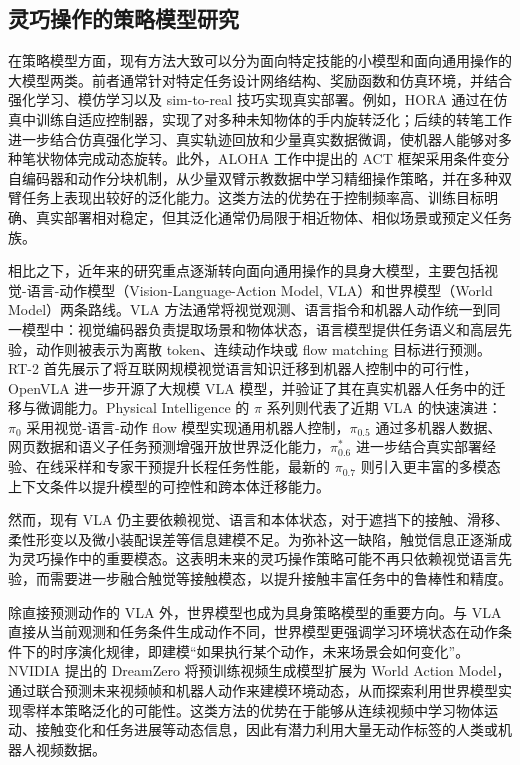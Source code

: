 \subsection{灵巧操作的策略模型研究}
在策略模型方面，现有方法大致可以分为面向特定技能的小模型和面向通用操作的大模型两类。前者通常针对特定任务设计网络结构、奖励函数和仿真环境，并结合强化学习、模仿学习以及 sim-to-real 技巧实现真实部署。例如，HORA 通过在仿真中训练自适应控制器，实现了对多种未知物体的手内旋转泛化\citep{qi2022hora}；后续的转笔工作进一步结合仿真强化学习、真实轨迹回放和少量真实数据微调，使机器人能够对多种笔状物体完成动态旋转\citep{wang2025penspin}。此外，ALOHA 工作中提出的 ACT 框架采用条件变分自编码器和动作分块机制，从少量双臂示教数据中学习精细操作策略，并在多种双臂任务上表现出较好的泛化能力\citep{Zhao-RSS-23}。这类方法的优势在于控制频率高、训练目标明确、真实部署相对稳定，但其泛化通常仍局限于相近物体、相似场景或预定义任务族。

相比之下，近年来的研究重点逐渐转向面向通用操作的具身大模型，主要包括视觉-语言-动作模型（Vision-Language-Action Model, VLA）和世界模型（World Model）两条路线。VLA 方法通常将视觉观测、语言指令和机器人动作统一到同一模型中：视觉编码器负责提取场景和物体状态，语言模型提供任务语义和高层先验，动作则被表示为离散 token、连续动作块或 flow matching 目标进行预测。RT-2 首先展示了将互联网规模视觉语言知识迁移到机器人控制中的可行性\citep{zitkovich2023rt2}，OpenVLA 进一步开源了大规模 VLA 模型，并验证了其在真实机器人任务中的迁移与微调能力\citep{kim2025openvla}。Physical Intelligence 的 $\pi$ 系列则代表了近期 VLA 的快速演进：$\pi_0$ 采用视觉-语言-动作 flow 模型实现通用机器人控制\citep{BlackK-RSS-25}，$\pi_{0.5}$ 通过多机器人数据、网页数据和语义子任务预测增强开放世界泛化能力\citep{physicalintelligence2025pi05}，$\pi^{*}_{0.6}$ 进一步结合真实部署经验、在线采样和专家干预提升长程任务性能\citep{physicalintelligence2025pi06}，最新的 $\pi_{0.7}$ 则引入更丰富的多模态上下文条件以提升模型的可控性和跨本体迁移能力\citep{physicalintelligence2026pi07}。

然而，现有 VLA 仍主要依赖视觉、语言和本体状态，对于遮挡下的接触、滑移、柔性形变以及微小装配误差等信息建模不足。为弥补这一缺陷，触觉信息正逐渐成为灵巧操作中的重要模态。这表明未来的灵巧操作策略可能不再只依赖视觉语言先验，而需要进一步融合触觉等接触模态，以提升接触丰富任务中的鲁棒性和精度。

除直接预测动作的 VLA 外，世界模型也成为具身策略模型的重要方向。与 VLA 直接从当前观测和任务条件生成动作不同，世界模型更强调学习环境状态在动作条件下的时序演化规律，即建模“如果执行某个动作，未来场景会如何变化”。NVIDIA 提出的 DreamZero 将预训练视频生成模型扩展为 World Action Model，通过联合预测未来视频帧和机器人动作来建模环境动态，从而探索利用世界模型实现零样本策略泛化的可能性\citep{ye2026dreamzero}。这类方法的优势在于能够从连续视频中学习物体运动、接触变化和任务进展等动态信息，因此有潜力利用大量无动作标签的人类或机器人视频数据。


